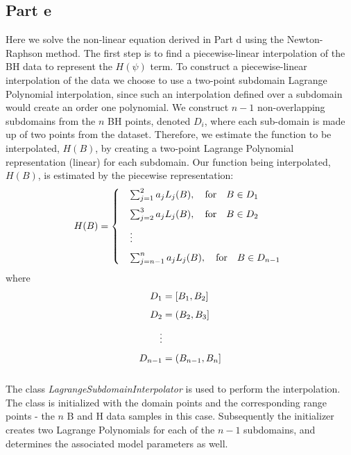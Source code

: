\documentclass[11pt]{article}
\begin{document}
\FloatBarrier
\subsection*{Part e}
Here we solve the non-linear equation derived in Part d using the Newton-Raphson method. The first step is to find a piecewise-linear interpolation of the BH data to represent the $H(\psi)$ term. To construct a piecewise-linear interpolation of the data we choose to use a two-point subdomain Lagrange Polynomial interpolation, since such an interpolation defined over a subdomain would create an order one polynomial. We construct $n-1$ non-overlapping subdomains from the $n$ BH points,  denoted $D_i$, where each sub-domain is made up of two points from the dataset. Therefore, we estimate the function to be interpolated, $H(B)$, by creating a two-point Lagrange Polynomial representation (linear) for each subdomain. Our function being interpolated, $H(B)$, is estimated by the piecewise representation:
\begin{align}
    H(B) =
    \left\{\;
        \begin{array}{r@{\;}l}
            &\sum^2_{j=1} a_j L_j(B), \quad \text{for} \quad B \in D_1\\[0.1in]
            &\sum^3_{j=2} a_j L_j(B), \quad \text{for}\quad B \in D_2\\[0.1in]
            &\vdots \\[0.1in]
            &\sum^n_{j=n-1} a_j L_j(B), \quad \text{for} \quad B \in D_{n-1} \label{eq:subdomain_lagrange_polynomail}
        \end{array}
    \right.
\end{align}
where
\begin{align}
    \begin{array}{r@{\;}l}
        D_1 &= [B_1, B_2]\\[0.1in]
        D_2 &= (B_2, B_3]\\[0.1in]
	\vdots \\[0.1in]
        D_{n-1} &= (B_{n-1}, B_{n}]\\[0.1in]
    \end{array}
\end{align}

The class \textit{LagrangeSubdomainInterpolator} is used to perform the interpolation. The class is initialized with the domain points and the corresponding range points - the $n$ B and H data samples in this case. Subsequently the initializer creates two Lagrange Polynomials for each of the $n-1$ subdomains, and determines the associated model parameters as well.
\end{document}
